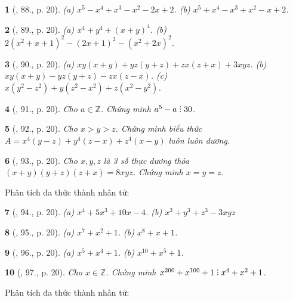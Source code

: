 \documentclass{article}
\newtheorem{baitoan}{}
\DeclareRobustCommand{\divby}{%
	\mathrel{\vbox{\baselineskip.65ex\lineskiplimit0pt\hbox{.}\hbox{.}\hbox{.}}}%
}
\begin{document}
\begin{baitoan}[\cite{Tuyen_Toan_8}, 88., p. 20]
	(a) $x^5 - x^4 + x^3 - x^2 - 2x + 2$. (b) $x^5 + x^4 - x^3 + x^2 - x + 2$.
\end{baitoan}

\begin{baitoan}[\cite{Tuyen_Toan_8}, 89., p. 20]
	(a) $x^4 + y^4 + (x + y)^4$. (b) $2(x^2 + x + 1)^2 - (2x + 1)^2 - (x^2 + 2x)^2$.
\end{baitoan}

\begin{baitoan}[\cite{Tuyen_Toan_8}, 90., p. 20]
	(a) $xy(x + y) + yz(y + z) + zx(z + x) + 3xyz$. (b) $xy(x + y) - yz(y + z) - zx(z - x)$. (c) $x(y^2 - z^2) + y(z^2 - x^2) + z(x^2 - y^2)$.
\end{baitoan}

\begin{baitoan}[\cite{Tuyen_Toan_8}, 91., p. 20]
	Cho $a\in\mathbb{Z}$. Chứng minh $a^5 - a\divby30$.
\end{baitoan}

\begin{baitoan}[\cite{Tuyen_Toan_8}, 92., p. 20]
	Cho $x > y > z$. Chứng minh biểu thức $A = x^4(y - z) + y^4(z - x) + z^4(x - y)$ luôn luôn dương.
\end{baitoan}

\begin{baitoan}[\cite{Tuyen_Toan_8}, 93., p. 20]
	Cho $x,y,z$ là 3 số thực dương thỏa $(x + y)(y + z)(z + x) = 8xyz$. Chứng minh $x = y = z$.
\end{baitoan}
Phân tích đa thức thành nhân tử:

\begin{baitoan}[\cite{Tuyen_Toan_8}, 94., p. 20]
	(a) $x^4 + 5x^3 + 10x - 4$. (b) $x^3 + y^3 + z^3 - 3xyz$
\end{baitoan}

\begin{baitoan}[\cite{Tuyen_Toan_8}, 95., p. 20]
	(a) $x^7 + x^2 + 1$. (b) $x^8 + x + 1$.
\end{baitoan}

\begin{baitoan}[\cite{Tuyen_Toan_8}, 96., p. 20]
	(a) $x^5 + x^4 + 1$. (b) $x^{10} + x^5 + 1$.
\end{baitoan}

\begin{baitoan}[\cite{Tuyen_Toan_8}, 97., p. 20]
	Cho $x\in\mathbb{Z}$. Chứng minh $x^{200} + x^{100} + 1\divby x^4 + x^2 + 1$.
\end{baitoan}
Phân tích đa thức thành nhân tử:
\end{document}

